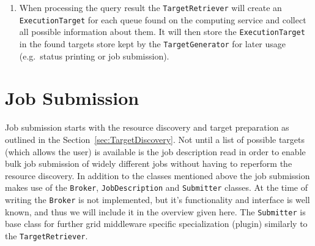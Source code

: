 \documentclass{book}
\newcommand{\Broker}{\texttt{Broker}}
\newcommand{\ExecutionTarget}{\texttt{ExecutionTarget}}
\newcommand{\JobDescription}{\texttt{JobDescription}}
\newcommand{\TargetGenerator}{\texttt{TargetGenerator}}
\newcommand{\TargetRetriever}{\texttt{TargetRetriever}}
\newcommand{\Submitter}{\texttt{Submitter}}
\begin{document}
\begin{enumerate}
{  tries to register at the service store kept by the
  {\TargetGenerator}. If allowed to register, the computing server is
  queried and the query result processed. The {\TargetGenerator} will
  not allow registrations from computing services present in its list
  of rejected computing services or from service that have already
  registered once. Computing services often register at more than one
  index server, thus different {\TargetRetriever}s may discover the
  same service.}
\item{When processing the query result the {\TargetRetriever} will
  create an {\ExecutionTarget} for each queue found on the computing
  service and collect all possible information about them. It will
  then store the {\ExecutionTarget} in the found targets store kept
  by the {\TargetGenerator} for later usage (e.g.\ status printing or
  job submission).}
\end{enumerate}

\section{Job Submission}
\label{sec:JobSubmission}

Job submission starts with the resource discovery and target
preparation as outlined in the Section~\ref{sec:TargetDiscovery}. Not
until a list of possible targets (which allows the user) is available
is the job description read in order to enable bulk job submission of
widely different jobs without having to reperform the resource
discovery. In addition to the classes mentioned above the job
submission makes use of the {\Broker}, {\JobDescription} and
{\Submitter} classes. At the time of writing the {\Broker} is not
implemented, but it's functionality and interface is well known, and
thus we will include it in the overview given here. The {\Submitter}
is base class for further grid middleware specific specialization
(plugin) similarly to the {\TargetRetriever}.

\begin{figure}[ht]
\end{figure}
\end{document}
